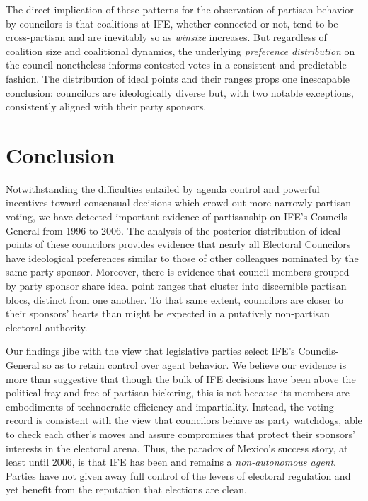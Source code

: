 \documentclass[12 pt, letter]{article}
\begin{document}
The direct implication of these patterns for the observation of
partisan behavior by councilors is that coalitions at IFE, whether
connected or not, tend to be cross-partisan and are inevitably so as
\emph{winsize} increases.  But regardless of coalition size and
coalitional dynamics, the underlying \emph{preference distribution}
on the council nonetheless informs contested votes in a consistent
and predictable fashion. The distribution of ideal points and their
ranges props one inescapable conclusion: councilors are
ideologically diverse but, with two notable exceptions, consistently
aligned with their party sponsors.

\section{Conclusion}\label{S:discussion}
Notwithstanding the difficulties entailed by agenda control and
powerful incentives toward consensual decisions which crowd out more
narrowly partisan voting, we have detected important evidence of
partisanship on IFE's Councils-General from 1996 to 2006.  The
analysis of the posterior distribution of ideal points of these
councilors provides evidence that nearly all Electoral Councilors
have ideological preferences similar to those of other colleagues
nominated by the same party sponsor. Moreover, there is evidence
that council members grouped by party sponsor share ideal point
ranges that cluster into discernible partisan blocs, distinct from
one another. To that same extent, councilors are closer to their
sponsors' hearts than might be expected in a putatively non-partisan
electoral authority.

Our findings jibe with the view that legislative parties select
IFE's Councils-General so as to retain control over agent behavior.
We believe our evidence is more than suggestive that though the bulk
of IFE decisions have been above the political fray and free of
partisan bickering, this is not because its members are embodiments
of technocratic efficiency and impartiality.  Instead, the voting
record is consistent with the view that councilors behave as party
watchdogs, able to check each other's moves and assure compromises
that protect their sponsors' interests in the electoral arena. Thus,
the paradox of Mexico's success story, at least until 2006, is that
IFE has been and remains a \emph{non-autonomous agent}. Parties have
not given away full control of the levers of electoral regulation
and yet benefit from the reputation that elections are clean.
\end{document}
